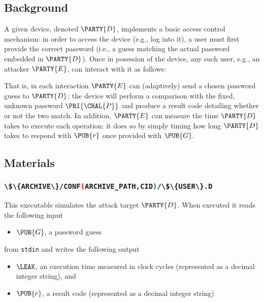 \documentclass[crop={false},multi={true},tikz={true}]{standalone}
\begin{document}

\subsection{Background}

A given device, denoted $\PARTY{D}$, 
implements a basic access control mechanism: in order to access the device
(e.g., log into it), a user must first provide the correct password (i.e., 
a guess matching the actual password embedded in $\PARTY{D}$).  
Once in posession of the device, any such user, e.g., 
an attacker $\PARTY{E}$, can interact with it as follows:

\begin{center}

\end{center}

\noindent
That is, in each interaction $\PARTY{E}$ can (adaptively) send 
a chosen password guess
to $\PARTY{D}$; the device will
perform a comparison with the fixed, unknown password $\PRI{\CHAL{P}}$ 
and produce 
a result code detailing whether or not the two match.
In addition, $\PARTY{E}$ can measure the time $\PARTY{D}$ takes to execute 
each operation: it does so
by simply timing how long $\PARTY{D}$ takes to respond with $\PUB{r}$ once
provided with $\PUB{G}$.

\subsection{Materials}

\subsubsection{\lstinline[language={bash}]|\$\{ARCHIVE\}/CONF(ARCHIVE_PATH,CID)/\$\{USER\}.D|}

This executable simulates the attack target $\PARTY{D}$.  When executed it 
reads the following input

\begin{itemize}
\item $\PUB{G}$,
      a  password guess
\end{itemize}

\noindent
from \lstinline[language={bash}]{stdin} and writes the following output

\begin{itemize}
\item $\LEAK$,
      an execution time measured in clock cycles
      (represented as a decimal integer string),
      and
\item $\PUB{r}$,
      a  result code
      (represented as a decimal integer string)
\end{itemize}
\end{document}
